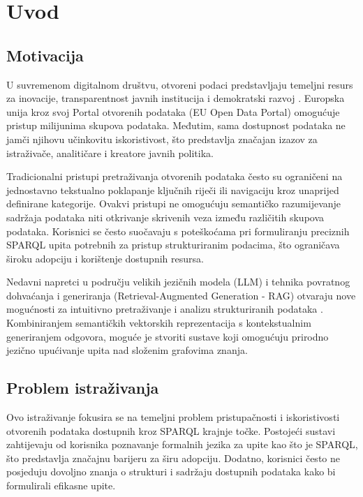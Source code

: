 \chapter{Uvod}
\label{ch:introduction}


\section{Motivacija}
\label{sec:motivation}

U suvremenom digitalnom društvu, otvoreni podaci predstavljaju temeljni resurs za inovacije, transparentnost javnih institucija i demokratski razvoj \cite{janssen2012benefits, charalabidis2018open, bizer2009linked}. Europska unija kroz svoj Portal otvorenih podataka (EU Open Data Portal) omogućuje pristup milijunima skupova podataka. Međutim, sama dostupnost podataka ne jamči njihovu učinkovitu iskoristivost, što predstavlja značajan izazov za istraživače, analitičare i kreatore javnih politika.

Tradicionalni pristupi pretraživanja otvorenih podataka često su ograničeni na jednostavno tekstualno poklapanje ključnih riječi ili navigaciju kroz unaprijed definirane kategorije. Ovakvi pristupi ne omogućuju semantičko razumijevanje sadržaja podataka niti otkrivanje skrivenih veza između različitih skupova podataka. Korisnici se često suočavaju s poteškoćama pri formuliranju preciznih SPARQL upita potrebnih za pristup strukturiranim podacima, što ograničava široku adopciju i korištenje dostupnih resursa.

Nedavni napretci u području velikih jezičnih modela (LLM) i tehnika povratnog dohvaćanja i generiranja (Retrieval-Augmented Generation - RAG) otvaraju nove mogućnosti za intuitivno pretraživanje i analizu strukturiranih podataka \cite{brown2020language, lewis2020retrieval, liu2023survey}. Kombiniranjem semantičkih vektorskih reprezentacija s kontekstualnim generiranjem odgovora, moguće je stvoriti sustave koji omogućuju prirodno jezično upućivanje upita nad složenim grafovima znanja.

\section{Problem istraživanja}
\label{sec:research_problem}

Ovo istraživanje fokusira se na temeljni problem pristupačnosti i iskoristivosti otvorenih podataka dostupnih kroz SPARQL krajnje točke. Postojeći sustavi zahtijevaju od korisnika poznavanje formalnih jezika za upite kao što je SPARQL, što predstavlja značajnu barijeru za širu adopciju. Dodatno, korisnici često ne posjeduju dovoljno znanja o strukturi i sadržaju dostupnih podataka kako bi formulirali efikasne upite.

